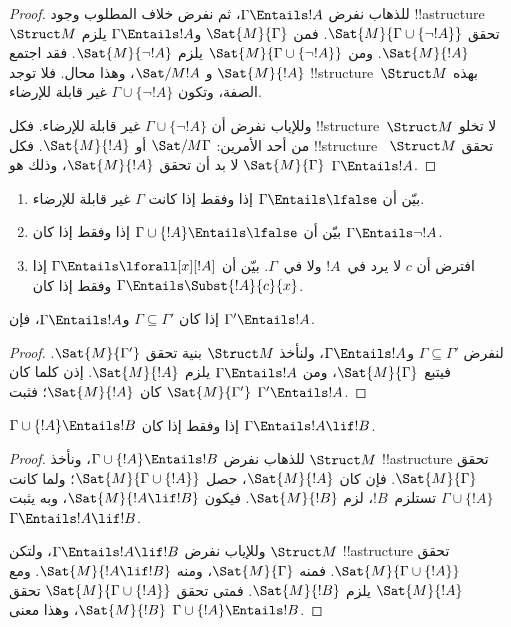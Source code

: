 \documentclass[../../../include/open-logic-section]{subfiles}
\begin{document}
\begin{proof}
للذهاب نفرض $\Gamma \Entails !A$، ثم نفرض خلاف المطلوب وجود
!!a{structure}~$\Struct M$ تحقق
$\Sat{M}{\Gamma \cup \{ \lnot !A \}}$. فمن
$\Sat{M}{\Gamma}$ و$\Gamma \Entails !A$ يلزم $\Sat{M}{!A}$.
ومن $\Sat{M}{\Gamma\cup \{ \lnot !A \}}$ يلزم
$\Sat{M}{\lnot !A}$. فقد اجتمع $\Sat{M}{!A}$ و
$\Sat/{M}{!A}$، وهذا محال. فلا توجد
!!{structure}~$\Struct M$ بهذه الصفة، وتكون
$\Gamma \cup \{ \lnot !A \}$ غير قابلة للإرضاء.

وللإياب نفرض أن $\Gamma \cup \{ \lnot !A \}$ غير قابلة للإرضاء.
فكل !!{structure}~$\Struct M$ لا تخلو من أحد الأمرين:
$\Sat/{M}{\Gamma}$ أو $\Sat{M}{!A}$. فكل !!{structure}
~$\Struct M$ تحقق $\Sat{M}{\Gamma}$ لا بد أن تحقق $\Sat{M}{!A}$،
وذلك هو $\Gamma \Entails !A$.
\end{proof}

\begin{prob}
\begin{enumerate}
\item بيّن أن $\Gamma \Entails \lfalse$ إذا وفقط إذا كانت $\Gamma$
  غير قابلة للإرضاء.
\item بيّن أن $\Gamma \cup \{!A\} \Entails \lfalse$ إذا وفقط إذا
  كان $\Gamma \Entails \lnot !A$.
\item افترض أن $c$ لا يرد في~$!A$ ولا في~$\Gamma$. بيّن أن
  $\Gamma \Entails \lforall[x][!A]$ إذا وفقط إذا كان
  $\Gamma \Entails \Subst{!A}{c}{x}$.
\end{enumerate}
\end{prob}

\begin{prop}
إذا كان $\Gamma \subseteq \Gamma'$ و$\Gamma \Entails !A$، فإن
$\Gamma' \Entails !A$.
\end{prop}

\begin{proof}
لنفرض $\Gamma \subseteq \Gamma'$ و$\Gamma \Entails !A$،
ولنأخذ $\Struct M$ بنية تحقق $\Sat{M}{\Gamma'}$.
فيتبع $\Sat{M}{\Gamma}$، ومن $\Gamma \Entails !A$ يلزم
$\Sat{M}{!A}$. إذن كلما كان $\Sat{M}{\Gamma'}$ كان
$\Sat{M}{!A}$؛ فثبت $\Gamma' \Entails !A$.
\end{proof}


\begin{thm}
$\Gamma \cup \{!A\} \Entails !B$ إذا وفقط إذا كان
$\Gamma \Entails !A \lif !B$.
\end{thm}

\begin{proof}
للذهاب نفرض
$\Gamma \cup \{ !A \} \Entails !B$، ونأخذ $\Struct M$
!!a{structure} تحقق $\Sat{M}{\Gamma}$. فإن كان $\Sat{M}{!A}$،
حصل $\Sat{M}{\Gamma \cup \{ !A \} }$؛ ولما كانت
$\Gamma \cup \{ !A \}$ تستلزم~$!B$، لزم $\Sat{M}{!B}$.
فيكون $\Sat{M}{!A \lif !B}$، وبه يثبت
$\Gamma \Entails !A \lif !B$.

وللإياب نفرض $\Gamma \Entails !A \lif !B$، ولتكن
$\Struct M$ !!a{structure} تحقق
$\Sat{M}{\Gamma \cup \{ !A \}}$. فمنه $\Sat{M}{\Gamma}$،
ومنه $\Sat{M}{!A \lif !B}$. ومع $\Sat{M}{!A}$ يلزم
$\Sat{M}{!B}$. فمتى تحقق
$\Sat{M}{\Gamma \cup \{ !A \} }$ تحقق $\Sat{M}{!B}$،
وهذا معنى $\Gamma \cup \{ !A \} \Entails !B$.
\end{proof}
\end{document}
